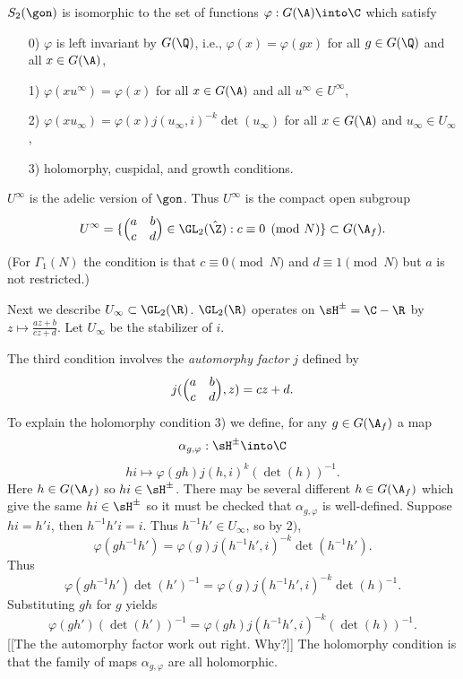 \documentclass{report}
\begin{document}
$S_2(\gon)$ is isomorphic to the set of functions
$\varphi:G(\A)\into\C$ which satisfy
\begin{itemize}
\item[0)] $\varphi$ is left invariant by
$G(\Q)$, i.e., $\varphi(x)=\varphi(gx)$ for
all $g\in G(\Q)$ and all $x\in G(\A)$,
\item[1)] $\varphi(xu^{\infty})=\varphi(x)$ for all
$x\in G(\A)$ and all $u^{\infty}\in U^{\infty}$,
\item[2)] $\varphi(xu_{\infty})=\varphi(x)j(u_{\infty},i)^{-k}\det(u_{\infty})$
   for all $x\in G(\A)$ and $u_{\infty}\in U_{\infty}$,
\item[3)] holomorphy, cuspidal, and growth conditions.
\end{itemize}
$U^{\infty}$ is the adelic version of $\gon$. Thus $U^{\infty}$
is the compact open subgroup
$$U^{\infty}=\{\Bigl(\begin{matrix}a&b\\c&d\end{matrix}\Bigr)\in\GL_2(\hat{\Z}):
               c\equiv 0\pmod{N}\}\subset G(\A_f).$$
(For $\Gamma_1(N)$ the condition is that $c\equiv 0\pmod{N}$
and $d\equiv 1\pmod{N}$ but $a$ is not restricted.)

Next we describe $U_{\infty}\subset\GL_2(\R)$. $\GL_2(\R)$
operates on $\sH^{\pm}=\C-\R$ by
$z\mapsto\frac{az+b}{cz+d}$. Let $U_{\infty}$ be
the stabilizer of $i$.

The third condition involves the {\em automorphy factor}
$j$ defined by
$$j(\Bigl(\begin{matrix}a&b\\c&d\end{matrix}\Bigr),z)=cz+d.$$
To explain the holomorphy condition 3) we define, for
any $g\in G(\A_f)$ a map
$$\alpha_{g,\varphi}:\sH^{\pm}\into\C$$
$$hi\mapsto\varphi(gh)j(h,i)^k(\det(h))^{-1}.$$
Here $h\in G(\A_f)$ so $hi\in\sH^{\pm}$. There may be
several different $h\in G(\A_f)$ which give the same
$hi\in\sH^{\pm}$ so it must be checked that
$\alpha_{g,\varphi}$ is well-defined. Suppose
$hi=h'i$, then $h^{-1}h'i=i$. Thus $h^{-1}h'\in U_{\infty}$,
so by $2)$,
$$\varphi(gh^{-1}h')=\varphi(g)j(h^{-1}h',i)^{-k}\det(h^{-1}h').$$
Thus $$\varphi(gh^{-1}h')\det(h')^{-1}=\varphi(g)j(h^{-1}h',i)^{-k}\det(h)^{-1}.$$
Substituting $gh$ for $g$ yields
$$\varphi(gh')(\det(h'))^{-1}=\varphi(gh)j(h^{-1}h',i)^{-k}(\det(h))^{-1}.$$
[[The the automorphy factor work out right.  Why?]]
The holomorphy condition is that the family of maps
$\alpha_{g,\varphi}$ are all holomorphic.
\end{document}
